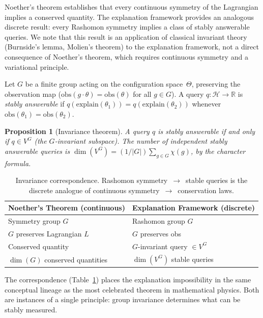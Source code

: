 \documentclass[11pt,a4paper]{article}
\newtheorem{proposition}[theorem]{Proposition}
\newcommand{\R}{\mathbb{R}}
\begin{document}
Noether's theorem \citep{noether1918invariante} establishes that every
continuous symmetry of the Lagrangian implies a conserved quantity.  The
explanation framework provides an analogous discrete result: every Rashomon
symmetry implies a class of stably answerable queries.  We note that this
result is an application of classical invariant theory (Burnside's lemma,
Molien's theorem) to the explanation framework, not a direct consequence of
Noether's theorem, which requires continuous symmetry and a variational
principle.

Let $G$ be a finite group acting on the configuration space~$\Theta$,
preserving the observation map ($\mathrm{obs}(g \cdot \theta) =
\mathrm{obs}(\theta)$ for all $g \in G$).  A query
$q\colon \mathcal{H} \to \R$ is \emph{stably answerable} if
$q(\mathrm{explain}(\theta_1)) = q(\mathrm{explain}(\theta_2))$ whenever
$\mathrm{obs}(\theta_1) = \mathrm{obs}(\theta_2)$.

\begin{proposition}[Invariance theorem]
\label{prop:noether}
A query $q$ is stably answerable if and only if $q \in V^G$ (the
$G$-invariant subspace).  The number of independent stably answerable queries
is $\dim(V^G) = (1/|G|) \sum_{g \in G} \chi(g)$, by the character formula.
\end{proposition}

\begin{table}[t]
  \centering
  \small
  \begin{tabular}{@{}ll@{}}
    \toprule
    \textbf{Noether's Theorem (continuous)} & \textbf{Explanation Framework (discrete)} \\
    \midrule
    Symmetry group $G$ & Rashomon group $G$ \\
    $G$ preserves Lagrangian $L$ & $G$ preserves obs \\
    Conserved quantity & $G$-invariant query $\in V^G$ \\
    $\dim(G)$ conserved quantities & $\dim(V^G)$ stable queries \\
    \bottomrule
  \end{tabular}
  \caption{Invariance correspondence.  Rashomon symmetry~$\to$~stable queries
    is the discrete analogue of continuous symmetry~$\to$~conservation laws.}
  \label{tab:noether-dictionary}
\end{table}

The correspondence (Table~\ref{tab:noether-dictionary}) places the explanation
impossibility in the same conceptual lineage as the most celebrated theorem in
mathematical physics.  Both are instances of a single principle: group
invariance determines what can be stably measured.
\end{document}
